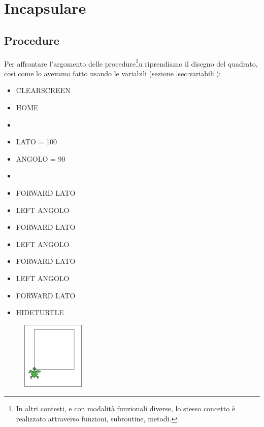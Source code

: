 \chapter{Incapsulare} \label{cap:incapsulare}

\section{Procedure}

Per affrontare l'argomento delle procedure\footnote{In altri contesti, e con modalità funzionali
diverse, lo stesso concetto è realizzato attraverso funzioni, subroutine, metodi.}u riprendiamo il disegno del quadrato, così come lo avevamo fatto usando le variabili (sezione \ref{sec:variabili}):

\vskip 1cm

\begin{scriptsize}
\begin{minipage}{0.40\textwidth}
\begin{itemize}[itemsep=-3pt,parsep=2pt]
\item[] CLEARSCREEN            
\item[] HOME
\item[] 
\item[] LATO = 100
\item[] ANGOLO = 90
\item[] 
\item[] FORWARD LATO
\item[] LEFT ANGOLO
\item[] FORWARD LATO
\item[] LEFT ANGOLO
\item[] FORWARD LATO
\item[] LEFT ANGOLO
\item[] FORWARD LATO
\item[] HIDETURTLE	       
\end{itemize}
\end{minipage}
\end{scriptsize}
\begin{minipage}{0.4\textwidth}
\begin{figure}[H]
   \includegraphics[width=3.0cm,trim=4 4 8 4,clip]{./images/incapsulare/incapsulare-1.png}
   \label{inc-1}
\end{figure}
\end{minipage} \hfill

